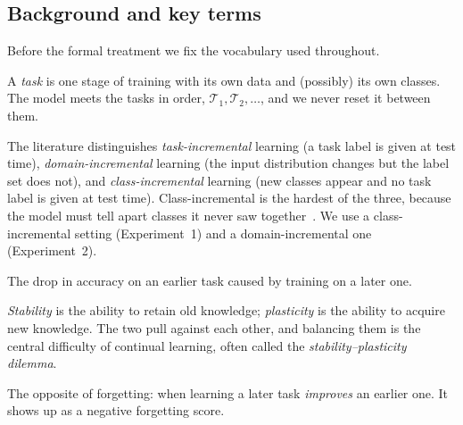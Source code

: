 \documentclass[11pt]{article}
\begin{document}
\subsection{Background and key terms}
Before the formal treatment we fix the vocabulary used throughout.
\begin{description}[leftmargin=0pt,labelindent=0pt,style=nextline,topsep=2pt,itemsep=3pt]
  \item[Task and the task stream.] A \emph{task} is one stage of training with its
        own data and (possibly) its own classes. The model meets the tasks in
        order, $\mathcal{T}_1,\mathcal{T}_2,\dots$, and we never reset it between
        them.
  \item[Three continual-learning scenarios.] The literature distinguishes
        \emph{task-incremental} learning (a task label is given at test time),
        \emph{domain-incremental} learning (the input distribution changes but the
        label set does not), and \emph{class-incremental} learning (new classes
        appear and no task label is given at test time). Class-incremental is the
        hardest of the three, because the model must tell apart classes it never
        saw together~\cite{delange2021survey}. We use a class-incremental setting
        (Experiment~1) and a domain-incremental one (Experiment~2).
  \item[Catastrophic forgetting.] The drop in accuracy on an earlier task caused
        by training on a later one.
  \item[Stability and plasticity.] \emph{Stability} is the ability to retain old
        knowledge; \emph{plasticity} is the ability to acquire new knowledge. The
        two pull against each other, and balancing them is the central difficulty
        of continual learning, often called the \emph{stability--plasticity
        dilemma}.
  \item[Backward transfer.] The opposite of forgetting: when learning a later task
        \emph{improves} an earlier one. It shows up as a negative forgetting score.
\end{description}

\end{document}
